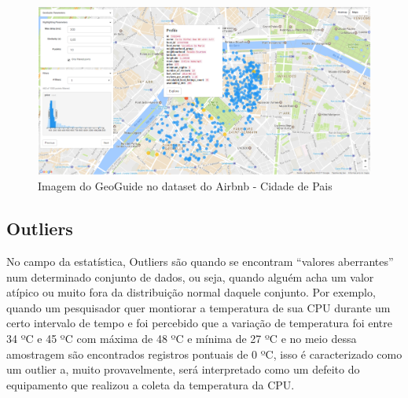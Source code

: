 \begin{figure}[t]
	\centering
	\includegraphics[width=\textwidth]{images/geoguide-example-airbnb}
	\caption{Imagem do GeoGuide no dataset do Airbnb - Cidade de Pais}
	\label{fig:geoguide-example-airbnb}
	\vspace{-10pt}
\end{figure}

\subsection{Outliers}



No campo da estatística, Outliers são quando se encontram ``valores aberrantes'' num determinado conjunto de dados, ou seja, quando alguém acha um valor atípico ou muito fora da distribuição normal daquele conjunto. Por exemplo, quando um pesquisador quer montiorar a temperatura de sua CPU durante um certo intervalo de tempo e foi percebido que a variação de temperatura foi entre 34 ºC e 45 ºC com máxima de 48 ºC e mínima de 27 ºC e no meio dessa amostragem são encontrados registros pontuais de 0 ºC, isso é caracterizado como um outlier a, muito provavelmente, será interpretado como um defeito do equipamento que realizou a coleta da temperatura da CPU.

